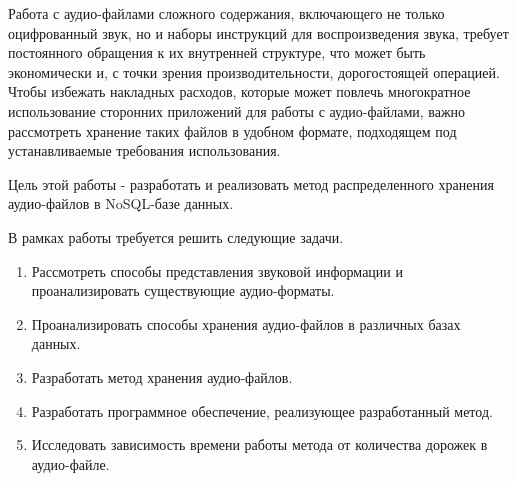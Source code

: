\Introduction
Работа с аудио-файлами сложного содержания, включающего не только оцифрованный звук, но и наборы инструкций для воспроизведения звука, требует постоянного обращения к их внутренней структуре, что может быть экономически и, с точки зрения производительности, дорогостоящей операцией. Чтобы избежать накладных расходов, которые может повлечь многократное использование сторонних приложений для работы с аудио-файлами, важно рассмотреть хранение таких файлов в удобном формате, подходящем под устанавливаемые требования использования.

Цель этой работы - разработать и реализовать метод распределенного хранения аудио-файлов в NoSQL-базе данных.

В рамках работы требуется решить следующие задачи.
\begin{enumerate}
    \item Рассмотреть способы представления звуковой информации и проанализировать существующие аудио-форматы.
    \item Проанализировать способы хранения аудио-файлов в различных базах данных.
    \item Разработать метод хранения аудио-файлов.
    \item Разработать программное обеспечение, реализующее разработанный метод.
    \item Исследовать зависимость времени работы метода от количества дорожек в аудио-файле.
\end{enumerate}

